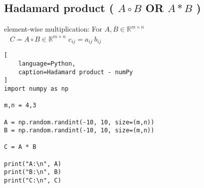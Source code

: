 \subsection{Hadamard product ( $A \circ B$ OR $A \ast B$ ) \cite{mfml/book/mml/Deisenroth-Faisal-Ong}}

element-wise multiplication: For $A,B \in \mathbb{R}^{m\times n}$
\\
\ 
\hfill
$
    C = A \circ B \in \mathbb{R}^{m\times n}
$
\hfill
$
    c_{ij} = a_{ij}\ b_{ij}
$
\hfill
\ 













\begin{lstlisting}[
    language=Python,
    caption=Hadamard product - numPy
]
import numpy as np

m,n = 4,3

A = np.random.randint(-10, 10, size=(m,n))
B = np.random.randint(-10, 10, size=(m,n))

C = A * B

print("A:\n", A)
print("B:\n", B)
print("C:\n", C)
\end{lstlisting}










